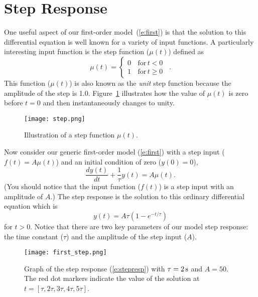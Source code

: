 \section{Step Response}\label{s:firststep}
One useful aspect of our first-order model~(\ref{e:first}) is that the solution to this differential equation is well known for a variety of input functions.  A particularly interesting input function is the \gls{step function} ($\mu(t)$) defined as
\begin{equation}
\label{e:step}
\mu(t)= \left\{ 
\begin{array}{cl}
0 & \, \mathrm{for}\, t < 0 \,\,\,\\
1 & \, \mathrm{for}\, t \geq 0
\end{array} \right.
.
\end{equation}
This function ($\mu(t)$) is also known as the \emph{unit} step function because the amplitude of the step is 1.0.
Figure~\ref{f:step} illustrates how the value of $\mu(t)$ is zero before $t=0$ and then instantaneously changes to unity.
\begin{figure}[hbt!]
\centering
\texttt{[image: step.png]}
\caption{Illustration of a step function $\mu(t)$.}
\label{f:step}
\end{figure}

Now consider our generic first-order model (\ref{e:first}) with a step input ($f(t)=A\mu(t)$) and an initial condition of zero ($y(0)=0$),
\begin{equation}
\label{e:firststepinput}
\frac{dy(t)}{dt} + \frac{1}{\tau}y(t) = A\mu(t).
\end{equation}
(You should notice that the input function ($f(t)$) is a step input with an amplitude of $A$.)
The \gls{step response} is the solution to this ordinary differential equation which is
\begin{equation}\label{e:stepresp}
y(t) = A\tau\left(1-e^{-t/\tau}\right)
\end{equation}
for $t>0$.  Notice that there are two key parameters of our model step response: the time constant ($\tau$) and the amplitude of the step input ($A$).

\begin{figure}[hbt]
\centering
\texttt{[image: first\_step.png]}
\caption{Graph of the step response (\ref{e:stepresp}) with $\tau=\unit[2]{s}$ and $A=50$.  The red dot markers indicate the value of the solution at $t=[\tau,2\tau,3\tau,4\tau,5\tau]$. }
\label{f:firststep}
\end{figure}


